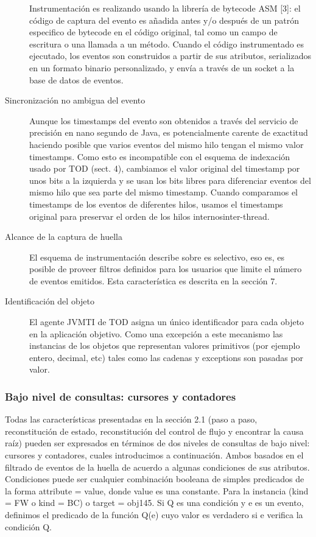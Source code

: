 \documentclass[12pt,legalpaper]{report}
\begin{document}
\begin{description}

Instrumentación es realizando usando la librería de bytecode ASM [3]:  el código de captura  del evento es añadida antes y/o después de un patrón especifico de bytecode en el código original, tal como un campo de escritura o una llamada a un método.  Cuando el código instrumentado es ejecutado, los eventos son construidos a partir de sus atributos, serializados en un formato binario personalizado, y envía a través de un socket a la base de datos de eventos.

	\item[Sincronización no ambigua del evento] Aunque los timestamps del evento son obtenidos a través del servicio de precisión en nano segundo de Java, es potencialmente carente de exactitud haciendo posible que varios eventos del mismo hilo tengan el mismo valor timestamps.  Como esto es incompatible con el esquema de indexación usado por TOD (sect. 4), cambiamos el valor original del timestamp por unos bits a la izquierda y se usan los bits libres para diferenciar eventos del mismo hilo que sea parte del mismo timestamp.  Cuando comparamos el timestamps de los eventos de diferentes hilos, usamos el timestamps original para preservar el orden de los hilos internos{inter-thread}.

	\item[Alcance de la captura de huella] El esquema de instrumentación describe sobre es selectivo, eso es, es posible de proveer filtros definidos para los usuarios que limite el número de eventos emitidos.  Esta característica es descrita en la sección 7.

	\item[Identificación del objeto] El agente JVMTI de TOD asigna un único identificador para cada objeto en la aplicación objetivo.  Como una excepción a este mecanismo las instancias de los objetos que representan valores primitivos (por ejemplo entero, decimal, etc) tales como las cadenas y exceptions son pasadas por valor.
\end{description}

			\subsubsection[Bajo nivel de consultas]{Bajo nivel de consultas: cursores y contadores}

	Todas las características presentadas en la sección 2.1 (paso a paso, reconstitución de estado, reconstitución del control de flujo y encontrar la causa raíz) pueden ser expresados en términos de dos niveles de consultas de bajo nivel:  cursores y contadores, cuales introducimos a continuación.  Ambos basados en el filtrado de eventos de la huella de acuerdo a algunas condiciones de sus atributos.  Condiciones puede ser cualquier combinación booleana de simples predicados de la forma attribute = value, donde value es una constante.  Para la instancia (kind = FW o kind = BC) o target = obj145.  Si Q es una condición y e es un evento, definimos el predicado de la función Q(e) cuyo valor es verdadero si e verifica la condición Q.
\end{document}
